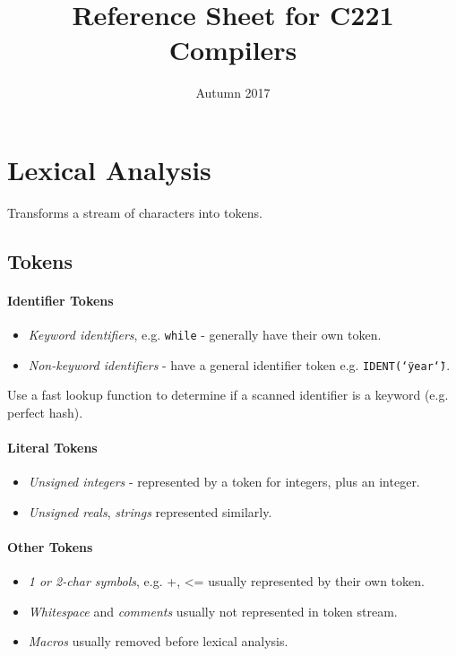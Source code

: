 \documentclass[twocolumn,english]{article}
\begin{document}
\title{Reference Sheet for C221 Compilers}

\date{Autumn 2017}
\maketitle

\section{Lexical Analysis}

Transforms a stream of characters into tokens.

\subsection{Tokens}

\paragraph{Identifier Tokens}
\begin{itemize}
\item \emph{Keyword identifiers}, e.g. \texttt{while} - generally have their
own token.
\item \emph{Non-keyword identifiers} - have a general identifier token e.g.
\texttt{IDENT(\char`\"{}year\char`\"{})}.
\end{itemize}
Use a fast lookup function to determine if a scanned identifier is
a keyword (e.g. perfect hash).

\paragraph{Literal Tokens}
\begin{itemize}
\item \emph{Unsigned integers} - represented by a token for integers, plus
an integer.
\item \emph{Unsigned reals}, \emph{strings} represented similarly.
\end{itemize}

\paragraph{Other Tokens}
\begin{itemize}
\item \emph{1 or 2-char symbols}, e.g. +, \textless{}= usually represented
by their own token.
\item \emph{Whitespace} and \emph{comments} usually not represented in token
stream.
\item \emph{Macros} usually removed before lexical analysis.
\end{itemize}
\end{document}
